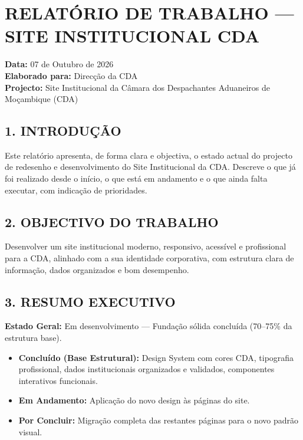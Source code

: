 \section{RELATÓRIO DE TRABALHO --- SITE INSTITUCIONAL
CDA}\label{relatuxf3rio-de-trabalho-site-institucional-cda}

\textbf{Data:} 07 de Outubro de 2026\\
\textbf{Elaborado para:} Direcção da CDA\\
\textbf{Projecto:} Site Institucional da Câmara dos Despachantes
Aduaneiros de Moçambique (CDA)

\subsection{1. INTRODUÇÃO}\label{introduuxe7uxe3o}

Este relatório apresenta, de forma clara e objectiva, o estado actual do
projecto de redesenho e desenvolvimento do Site Institucional da CDA.
Descreve o que já foi realizado desde o início, o que está em andamento
e o que ainda falta executar, com indicação de prioridades.

\subsection{2. OBJECTIVO DO TRABALHO}\label{objectivo-do-trabalho}

Desenvolver um site institucional moderno, responsivo, acessível e
profissional para a CDA, alinhado com a sua identidade corporativa, com
estrutura clara de informação, dados organizados e bom desempenho.

\subsection{3. RESUMO EXECUTIVO}\label{resumo-executivo}

\textbf{Estado Geral:} Em desenvolvimento --- Fundação sólida concluída
(70--75\% da estrutura base).

\begin{itemize}
\tightlist
\item
  \textbf{Concluído (Base Estrutural):} Design System com cores CDA,
  tipografia profissional, dados institucionais organizados e validados,
  componentes interativos funcionais.
\item
  \textbf{Em Andamento:} Aplicação do novo design às páginas do site.
\item
  \textbf{Por Concluir:} Migração completa das restantes páginas para o
  novo padrão visual.
\end{itemize}

